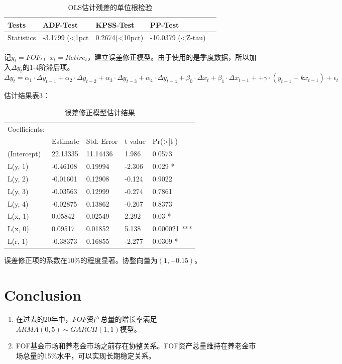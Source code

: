 \documentclass[10pt]{article}
\begin{document}
\begin{table}[]
    \centering
    \caption{OLS估计残差的单位根检验}
    \label{my-label}
    \begin{tabular}{l | llll}
        Tests        & ADF-Test       & KPSS-Test      & PP-Test               \\  \hline
        Statistics   & -3.1799 (<1pct & 0.2674(<10pct) & -10.0379 (<Z-tau)  
    \end{tabular}
\end{table}

记$y_t = FOF_t$，$x_t = Retire_t$，建立误差修正模型。由于使用的是季度数据，所以加入$\Delta y_t$的1-4阶滞后项。
$$\Delta y_t = \alpha_1 \cdot \Delta y_{t-1} + \alpha_2  \cdot \Delta  y_{t-2} + \alpha_3 \cdot \Delta  y_{t-3} + \alpha_4 \cdot \Delta  y_{t-4} + \beta_0 \cdot \Delta  x_t+\beta_1 \cdot \Delta  x_{t-1} + +\gamma \cdot ( y_{t-1}-kx_{t-1}) + \epsilon_t$$


估计结果表3：
\begin{table}[]
    \centering
    \caption{误差修正模型估计结果}
    \label{my-label}
    \begin{tabular}{l | llll}
        Coefficients: &          &            &         &                     \\
                      & Estimate & Std. Error & t value & Pr(\textgreater|t|) \\  \hline
        (Intercept)   & 22.13335 & 11.14436   & 1.986   & 0.0573              \\
        L(y, 1)       & -0.46108 & 0.19994    & -2.306  & 0.029 *             \\
        L(y, 2)       & -0.01601 & 0.12908    & -0.124  & 0.9022              \\
        L(y, 3)       & -0.03563 & 0.12999    & -0.274  & 0.7861              \\
        L(y, 4)       & -0.02875 & 0.13862    & -0.207  & 0.8373              \\
        L(x, 1)       & 0.05842  & 0.02549    & 2.292   & 0.03 *              \\
        L(x, 0)       & 0.09517  & 0.01852    & 5.138   & 0.000021 ***        \\
        L(r, 1)       & -0.38373 & 0.16855    & -2.277  & 0.0309 *           
    \end{tabular}
\end{table}


误差修正项的系数在10\%的程度显著。协整向量为$(1, -0.15)$。


\section{Conclusion}
    \begin{enumerate}
        \item 在过去的20年中，$FOF$资产总量的增长率满足$ARMA(0,5) \sim GARCH(1,1)$模型。
        \item FOF基金市场和养老金市场之前存在协整关系。FOF资产总量维持在养老金市场总量的15\%水平，可以实现长期稳定关系。
    \end{enumerate}
\end{document}

